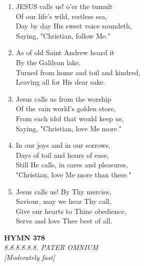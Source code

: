 \documentclass[11pt,a4paper]{article}
\begin{document}
\begin{enumerate}
    \item JESUS calls us! o'er the tumult \\
        Of our life's wild, restless sea, \\
        Day by day His sweet voice soundeth, \\
        Saying, "Christian, follow Me."

    \item As of old Saint Andrew heard it \\
        By the Galilean lake, \\
        Turned from home and toil and kindred, \\
        Leaving all for His dear sake.

    \item Jesus calls us from the worship \\
        Of the vain world's golden store, \\
        From each idol that would keep us, \\
        Saying, "Christian, love Me more."

    \item In our joys and in our sorrows, \\
        Days of toil and hours of ease, \\
        Still He calls, in cares and pleasures, \\
        "Christian, love Me more than these."

    \item Jesus calls us! By Thy mercies, \\
        Saviour, may we hear Thy call, \\
        Give our hearts to Thine obedience, \\
        Serve and love Thee best of all.

\end{enumerate}

\newpage
\begin{center}
    {\Large \textbf{HYMN 378}}
    \\
    \textit{8.8.8.8.8.8. PATER OMNIUM}
    \\
    \textit{\small [Moderately fast]}
\end{center}
\vspace{1em}
\end{document}
